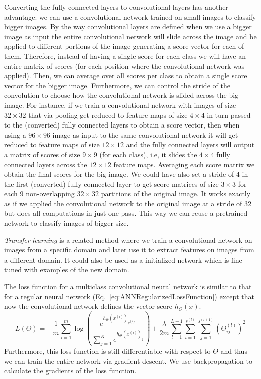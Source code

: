 Converting the fully connected layers to convolutional layers has another advantage: we can use a convolutional network trained on small images to classify bigger images. By the way convolutional layers are defined when we use a bigger image as input the entire convolutional network will slide across the image and be applied to different portions of the image generating a score vector for each of them. Therefore, instead of having a single score for each class we will have an entire matrix of scores (for each position where the convolutional network was applied). Then, we can average over all scores per class to obtain a single score vector for the bigger image. Furthermore, we can control the stride of the convolution to choose how the convolutional network is slided across the big image.
For instance, if we train a convolutional network with images of size $32\times 32$ that via pooling get reduced to feature maps of size $4\times 4$ in turn passed to the (converted) fully connected layers to obtain a score vector, then when using a $96\times 96$ image as input to the same convolutional network it will get reduced to feature maps of size $12 \times 12$ and the fully connected layers will output a matrix of scores of size $9\times 9$ (for each class), i.e, it slides the $4\times 4$ fully connected layers across the $12\times 12$ feature maps. Averaging each score matrix we obtain the final scores for the big image. We could have also  set a stride of 4 in the first (converted) fully connected layer to get score matrices of size $3\times 3$ for each 9 non-overlapping $32\times 32$ partitions of the original image. It works exactly as if we applied the convolutional network to the original image at a stride of 32 but does all computations in just one pass. This way we can reuse a pretrained network to classify images of bigger size. 

\emph{Transfer learning} is a related method where we train a convolutional network on images from a specific domain and later use it to extract features on images from a different domain. It could also be used as a initialized network which is fine tuned with examples of the new domain.

The loss function for a multiclass convolutional neural network is similar to that for a regular neural network (Eq.~\ref{eq:ANNRegularizedLossFunction}) except that now the convolutional network defines the vector score $h_\Theta(x)$.
\begin{equation}
	L(\Theta) = -\frac{1}{m} \sum_{i=1}^m \log \left ( \frac{ e^{h_\Theta(x^{(i)})_{y^{(i)}}} }{ \sum_{j=1}^K e^{ h_\Theta (x^{(i)})_j} } \right ) + \frac{\lambda}{2m}\sum_{l=1}^{L-1}\sum_{i=1}^{s^{(l)}}\sum_{j=1}^{s^{(l+1)}} \left(\Theta^{(l)}_{ij}\right)^2
	\label{eq:ConvNetLossFunction}
\end{equation}
Furthermore, this loss function is still differentiable with respect to $\Theta$ and thus we can train the entire network via gradient descent. We use backpropagation to calculate the gradients of the loss function.

